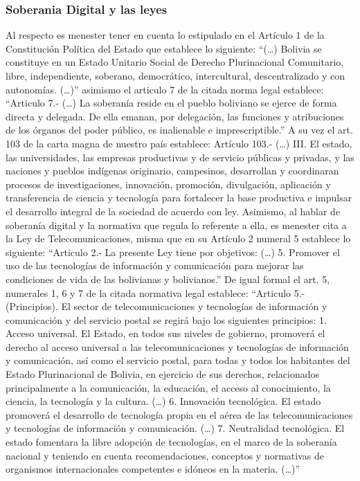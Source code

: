 \subsubsection{Soberania Digital y las leyes}
Al respecto es menester tener en cuenta lo estipulado en el Artículo 1 de la Constitución Política del Estado que establece lo siguiente: “(…) Bolivia se constituye en un Estado Unitario Social de Derecho Plurinacional Comunitario, libre, independiente, soberano, democrático, intercultural, descentralizado y con autonomías. (…)” asimismo el articulo 7 de la citada norma legal establece: “Articulo 7.- (…) La soberanía reside en el pueblo boliviano se ejerce de forma directa y delegada. De ella emanan, por delegación, las funciones y atribuciones de los órganos del poder público, es inalienable e imprescriptible.” A su vez el art. 103 de la carta magna de nuestro país establece: Artículo 103.- (…) III. El estado, las universidades, las empresas productivas y de servicio públicas y privadas, y las naciones y pueblos indígenas originario, campesinos, desarrollan y coordinaran procesos de investigaciones, innovación, promoción, divulgación, aplicación y transferencia de ciencia y tecnología para fortalecer la base productiva e impulsar el desarrollo integral de la sociedad de acuerdo con ley.
Asimismo, al hablar de soberanía digital y la normativa que regula lo referente a ella, es menester cita a la Ley de Telecomunicaciones, misma que en su Artículo 2 numeral 5 establece lo siguiente: “Articulo 2.- La presente Ley tiene por objetivos: (…) 5. Promover el uso de las tecnologías de información y comunicación para mejorar las condiciones de vida de las bolivianas y bolivianos.” De igual formal el art. 5, numerales 1, 6 y 7 de la citada normativa legal establece: “Articulo 5.- (Principios). El sector de telecomunicaciones y tecnologías de información y comunicación y del servicio postal se regirá bajo los siguientes principios: 1. Acceso universal. El Estado, en todos sus niveles de gobierno, promoverá el derecho al acceso universal a las telecomunicaciones y tecnologías de información y comunicación, así como el servicio postal, para todas y todos los habitantes del Estado Plurinacional de Bolivia, en ejercicio de sus derechos, relacionados principalmente a la comunicación, la educación, el acceso al conocimiento, la ciencia, la tecnología y la cultura. (…) 6. Innovación tecnológica. El estado promoverá el desarrollo de tecnología propia en el aérea de las telecomunicaciones y tecnologías de información y comunicación. (…) 7. Neutralidad tecnológica. El estado fomentara la libre adopción de tecnologías, en el marco de la soberanía nacional y teniendo en cuenta recomendaciones, conceptos y normativas de organismos internacionales competentes e idóneos en la materia. (…)”
